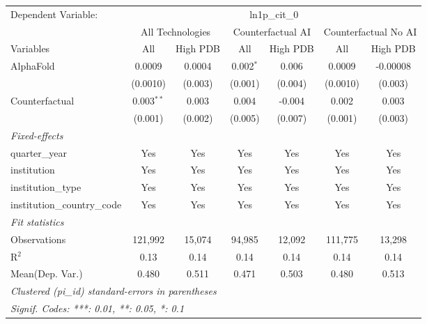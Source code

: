 \begingroup
\centering
\begin{tabular}{lcccccc}
   \tabularnewline \midrule \midrule
   Dependent Variable: & \multicolumn{6}{c}{ln1p\_cit\_0}\\
 & \multicolumn{2}{c}{All Technologies} & \multicolumn{2}{c}{Counterfactual AI} & \multicolumn{2}{c}{Counterfactual No AI} \\
\cmidrule(lr){1-1}\cmidrule(lr){2-3} \cmidrule(lr){4-5} \cmidrule(lr){6-7}
Variables & \multicolumn{1}{c}{All} & \multicolumn{1}{c}{High PDB} & \multicolumn{1}{c}{All} & \multicolumn{1}{c}{High PDB} & \multicolumn{1}{c}{All} & \multicolumn{1}{c}{High PDB} \\
\cmidrule(lr){1-1}\cmidrule(lr){2-2} \cmidrule(lr){3-3} \cmidrule(lr){4-4} \cmidrule(lr){5-5} \cmidrule(lr){6-6} \cmidrule(lr){7-7}
   AlphaFold                    & 0.0009       & 0.0004  & 0.002$^{*}$ & 0.006   & 0.0009   & -0.00008\\   
                                & (0.0010)     & (0.003) & (0.001)     & (0.004) & (0.0010) & (0.003)\\   
   Counterfactual               & 0.003$^{**}$ & 0.003   & 0.004       & -0.004  & 0.002    & 0.003\\   
                                & (0.001)      & (0.002) & (0.005)     & (0.007) & (0.001)  & (0.003)\\   
   \midrule
   \emph{Fixed-effects}\\
   quarter\_year                & Yes          & Yes     & Yes         & Yes     & Yes      & Yes\\  
   institution                  & Yes          & Yes     & Yes         & Yes     & Yes      & Yes\\  
   institution\_type            & Yes          & Yes     & Yes         & Yes     & Yes      & Yes\\  
   institution\_country\_code   & Yes          & Yes     & Yes         & Yes     & Yes      & Yes\\  
   \midrule
   \emph{Fit statistics}\\
   Observations                 & 121,992      & 15,074  & 94,985      & 12,092  & 111,775  & 13,298\\  
   R$^2$                        & 0.13         & 0.14    & 0.14        & 0.14    & 0.14     & 0.14\\  
Mean(Dep. Var.) & 0.480 & 0.511 & 0.471 & 0.503 & 0.480 & 0.513 \\
   \midrule \midrule
   \multicolumn{7}{l}{\emph{Clustered (pi\_id) standard-errors in parentheses}}\\
   \multicolumn{7}{l}{\emph{Signif. Codes: ***: 0.01, **: 0.05, *: 0.1}}\\
\end{tabular}
\par\endgroup
